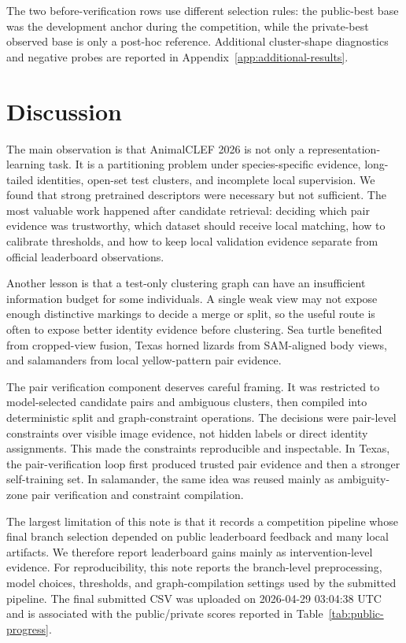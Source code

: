 \documentclass{ceurart}
\begin{document}
The two before-verification rows use different selection rules: the public-best base was the development anchor during the competition, while the private-best observed base is only a post-hoc reference. Additional cluster-shape diagnostics and negative probes are reported in Appendix~\ref{app:additional-results}.

\section{Discussion}
The main observation is that AnimalCLEF 2026 is not only a representation-learning task. It is a partitioning problem under species-specific evidence, long-tailed identities, open-set test clusters, and incomplete local supervision. We found that strong pretrained descriptors were necessary but not sufficient. The most valuable work happened after candidate retrieval: deciding which pair evidence was trustworthy, which dataset should receive local matching, how to calibrate thresholds, and how to keep local validation evidence separate from official leaderboard observations.

Another lesson is that a test-only clustering graph can have an insufficient information budget for some individuals. A single weak view may not expose enough distinctive markings to decide a merge or split, so the useful route is often to expose better identity evidence before clustering. Sea turtle benefited from cropped-view fusion, Texas horned lizards from SAM-aligned body views, and salamanders from local yellow-pattern pair evidence.

The pair verification component deserves careful framing. It was restricted to model-selected candidate pairs and ambiguous clusters, then compiled into deterministic split and graph-constraint operations. The decisions were pair-level constraints over visible image evidence, not hidden labels or direct identity assignments. This made the constraints reproducible and inspectable. In Texas, the pair-verification loop first produced trusted pair evidence and then a stronger self-training set. In salamander, the same idea was reused mainly as ambiguity-zone pair verification and constraint compilation.

The largest limitation of this note is that it records a competition pipeline whose final branch selection depended on public leaderboard feedback and many local artifacts. We therefore report leaderboard gains mainly as intervention-level evidence. For reproducibility, this note reports the branch-level preprocessing, model choices, thresholds, and graph-compilation settings used by the submitted pipeline. The final submitted CSV was uploaded on 2026-04-29 03:04:38 UTC and is associated with the public/private scores reported in Table~\ref{tab:public-progress}.
\end{document}
